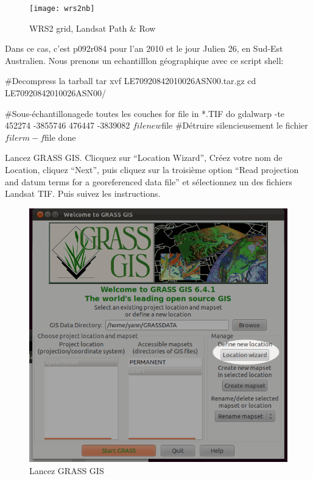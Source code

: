 \begin{figure}[htbp]
   \centering
   \texttt{[image: wrs2nb]}
   \caption{WRS2 grid, Landsat Path \& Row}
   \label{fig:wrs2}
\end{figure}

Dans ce cas, c'est p092r084 pour l'an 2010 et le jour Julien 26, en Sud-Est Australien. Nous prenons un echantilllon g\'eographique avec ce script shell:

\begin{smallverbatim}
 #Decompress la tarball
 tar xvf LE70920842010026ASN00.tar.gz
 cd LE70920842010026ASN00/

 #Sous-\'echantillonagede toutes les couches
 for file in *.TIF
   do gdalwarp -te 452274 -3855746 476447
      -3839082 $file new$file
   #D\'etruire silencieusement le fichier $file
   rm -f $file
 done
\end{smallverbatim}

Lancez GRASS GIS. Clicquez sur ``Location Wizard'', Cr\'eez votre nom de Location, cliquez ``Next'', puis cliquez sur la troisi\`eme option ``Read projection and datum terms for a georeferenced data file'' et s\'electionnez un des fichiers Landsat TIF. Puis suivez les instructions.

\begin{figure}[htbp]
   \centering
   \includegraphics[scale=0.35]{grass_rs000.png}
   \caption{Lancez GRASS GIS}
   \label{fig:grass_rs000}
\end{figure}

